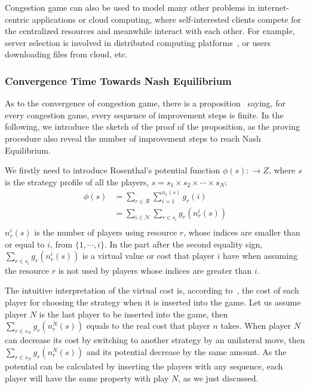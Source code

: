 Congestion game can also be used to model many other problems in internet-centric applications or cloud computing, where self-interested clients compete for the centralized resources and meanwhile interact with each other.
For example, server selection is involved in distributed computing platforms~\cite{Cloud_Computing_2010}, or users downloading files from cloud, etc.






\subsubsection*{Convergence Time Towards Nash Equilibrium}
As to the convergence of congestion game, there is a proposition~\cite{Voecking06congestiongames} saying, for every congestion game, every sequence of improvement steps is finite.
In the following, we introduce the sketch of the proof of the proposition, as the proving procedure also reveal the number of improvement steps to reach Nash Equilibrium.

We firstly need to introduce Rosenthal's potential function $\phi(s):\rightarrow Z$, where $s$ is the strategy profile of all the players, $s = s_1\times s_2\times\cdots\times s_N$:
\begin{equation}
\label{4}
\begin{split}
\phi(s) 
& =\sum\limits^{}_{r\in \mathcal{R}} \sum\limits^{n_r(s)}_{i=1} g_r(i)\\
& =\sum\limits_{i\in \mathcal{N}} \sum\limits^{}_{r\in s_i} g_r(n_r^i(s))\\
\end{split}
\end{equation}
$n_r^i(s)$ is the number of players using resource $r$, whose indices are smaller than or equal to $i$, \ie from $\{1,\cdots,i\}$. 
In the part after the second equality sign, $\sum\limits^{}_{r\in s_i} g_r(n_r^i(s))$ is a virtual value or cost that player $i$ have when assuming the resource $r$ is not used by players whose indices are greater than $i$.

The intuitive interpretation of the virtual cost is, according to~\cite{Voecking06congestiongames}, the cost of each player for choosing the strategy when it is inserted into the game.
Let us assume player $N$ is the last player to be inserted into the game, then $\sum\limits^{}_{r\in s_N} g_r(n_r^N(s))$ equals to the real cost that player $n$ takes.
When player $N$ can decrease its cost by switching to another strategy by an unilateral move, then $\sum\limits^{}_{r\in s_N} g_r(n_r^N(s))$ and its potential decrease by the same amount.
As the potential can be calculated by inserting the players with any sequence, each player will have the same property with play $N$, as we just discussed.

